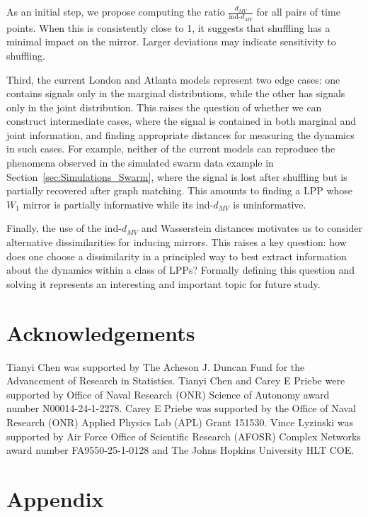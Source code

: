 \documentclass[12pt]{article}
\theoremstyle{definition}
\begin{document}
As an initial step, we propose computing the ratio $\frac{d_{MV}}{\text{ind-}d_{MV}}$ for all pairs of time points. When this is consistently close to 1, it suggests that shuffling has a minimal impact on the mirror. Larger deviations may indicate sensitivity to shuffling.

Third, the current London and Atlanta models represent two edge cases: one contains signals only in the marginal distributions, while the other has signals only in the joint distribution.
This raises the question of whether we can construct intermediate cases, where the signal is contained in both marginal and joint information, and finding appropriate distances for measuring the dynamics in such cases. For example, neither of the current models can reproduce the phenomena observed in the simulated swarm data example in Section~\ref{sec:Simulations_Swarm}, where the signal is lost after shuffling but is partially recovered after graph matching.
This amounts to finding a LPP whose $W_1$ mirror is partially informative while its ind-$d_{MV}$ is uninformative.

Finally, the use of the ind-$d_{MV}$ and Wasserstein distances motivates us to consider alternative dissimilarities for inducing mirrors.
This raises a key question: how does one choose a dissimilarity in a principled way to best extract information about the dynamics within a class of LPPs? Formally defining this question and solving it represents an interesting and important topic for future study.


\section*{Acknowledgements}

Tianyi Chen was supported by The Acheson J. Duncan Fund for the Advancement of Research in Statistics. Tianyi Chen and Carey E Priebe were supported by Office of Naval Research (ONR) Science of Autonomy award number N00014-24-1-2278. Carey E Priebe was supported by the Office of Naval Research (ONR) Applied Physics Lab (APL) Grant 151530. Vince Lyzinski was supported by Air Force Office of Scientific Research (AFOSR) Complex Networks award number FA9550-25-1-0128 and The Johns Hopkins University HLT COE.

\section{Appendix}
\end{document}
